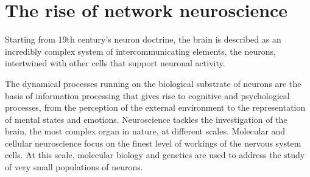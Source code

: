 

\section{The rise of network neuroscience}
Starting from 19th century’s neuron doctrine, the brain is described as an incredibly complex system of intercommunicating elements, the neurons, intertwined with other cells that support neuronal activity.

The dynamical processes running on the biological substrate of neurons are the basis of information processing that gives rise to cognitive and psychological processes, from the perception of the external environment to the representation of mental states and emotions.
Neuroscience tackles the investigation of the brain, the most complex organ in nature, at different scales.
Molecular and cellular neuroscience focus on the finest level of workings of the nervous system cells.
At this scale, molecular biology and genetics are used to address the study of very small populations of neurons.

